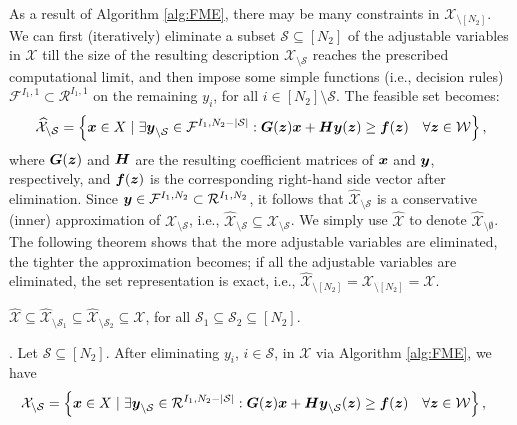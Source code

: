 \documentclass[fleqn,isre,blindrev]{informs4}
\newcommand{\mb}[1]{\mbox{\boldmath \ensuremath{#1}}}
\begin{document}
	
	As a result of Algorithm \ref{alg:FME}, there may be many constraints in $\mathcal{X}_{\setminus [N_2]}$.  We can first (iteratively) eliminate a subset $\mathcal{S}\subseteq [N_2]$ of the adjustable variables in $\mathcal{X}$ till the size of the resulting description $\mathcal{X}_{\setminus \mathcal{S}}$ reaches the prescribed computational limit, and then impose some simple functions (i.e.,  decision rules)  $\mathcal{F}^{I_1,1} \subset \mathcal{R}^{I_1,1}$ on the remaining $y_i$, for all $i \in [N_2]\setminus \mathcal{S}$. The feasible set becomes:
\begin{equation*}
	\widehat{\mathcal{X}}_{\setminus \mathcal{S}} = \left\{ \mb{x} \in X \hspace{3pt} | \hspace{3pt} \exists  \mb{y}_{\setminus \mathcal{S}} \in \mathcal{F}^{I_1,N_2-|\mathcal{S}|}: \mb{G}(\mb{z})\mb{x}+\mb{H}\mb{y}(\mb{z}) \geq \mb{f}(\mb{z}) \quad \forall \mb{z} \in \mathcal{W} \right\},
\end{equation*}
	where $\mb{G}(\mb{z})$ and $\mb{H}$ are the resulting coefficient matrices of $\mb{x}$ and $\mb{y}$, respectively, and $\mb{f}(\mb{z})$ is the corresponding right-hand side vector after elimination. Since $\mb{y} \in \mathcal{F}^{I_1,N_2} \subset \mathcal{R}^{I_1,N_2}$, it follows that $\widehat{\mathcal{X}}_{\setminus \mathcal{S}} $ is a conservative (inner) approximation of $\mathcal{X}_{\setminus \mathcal{S}}$, i.e., $\widehat{\mathcal{X}}_{\setminus \mathcal{S}} \subseteq \mathcal{X}_{\setminus \mathcal{S}}$. We simply use $\widehat{\mathcal{X}}$ to denote $\widehat{\mathcal{X}}_{\setminus \emptyset}$. The following theorem shows that the more adjustable variables are eliminated, the tighter the approximation becomes; if all the adjustable variables are eliminated, the set representation is exact, i.e., $\widehat{\mathcal{X}}_{\setminus [N_2]} = \mathcal{X}_{\setminus [N_2]}= \mathcal{X}$. 
	\begin{theorem} \label{thm:subset}
		$\widehat{\mathcal{X}}\subseteq\widehat{\mathcal{X}}_{\setminus \mathcal{S}_1} \subseteq \widehat{\mathcal{X}}_{\setminus \mathcal{S}_2} \subseteq \mathcal{X}$, for all $\mathcal{S}_1 \subseteq \mathcal{S}_2 \subseteq [N_2]$.
	\end{theorem} 
	. Let $\mathcal{S} \subseteq [N_2]$. After eliminating $y_i$, $i \in \mathcal{S}$, in $\mathcal{X}$ via Algorithm \ref{alg:FME}, we have 
\begin{align*}
		\mathcal{X}_{\setminus \mathcal{S}} & = \left\{ \mb{x} \in X \hspace{3pt} | \hspace{3pt} \exists \mb{y}_{\setminus \mathcal{S}} \in \mathcal{R}^{I_1,N_2-|\mathcal{S}|}: \mb{G}(\mb{z})\mb{x}+\mb{H}\mb{y}_{\setminus \mathcal{S}}(\mb{z}) \geq \mb{f}(\mb{z})  \quad \forall \mb{z} \in \mathcal{W}  \right\},
\end{align*}
\end{document}
